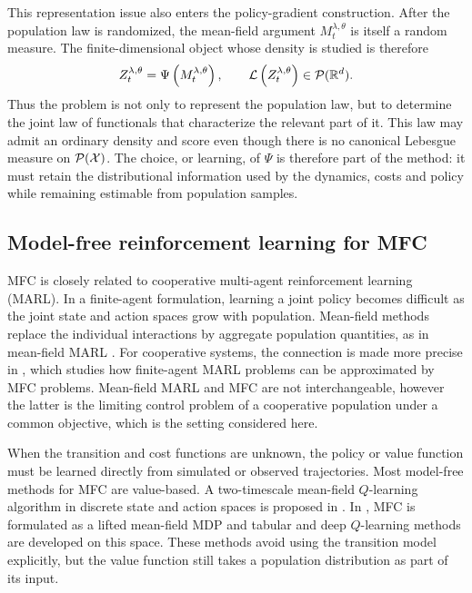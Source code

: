 This representation issue also enters the policy-gradient construction. After the population law is randomized, the mean-field argument $M_t^{\lambda,\theta}$ is itself a random measure. The finite-dimensional object whose density is studied is therefore
\begin{align}
    \label{eq:background-random_measure_representation}
    Z_t^{\lambda,\theta} = \Psi\left(M_t^{\lambda,\theta}\right),\qquad {\cal L}\left(Z_t^{\lambda,\theta}\right)\in{\cal P}(\mathbb{R}^d).
\end{align}
Thus the problem is not only to represent the population law, but to determine the joint law of functionals that characterize the relevant part of it. This law may admit an ordinary density and score even though there is no canonical Lebesgue measure on ${\cal P}({\cal X})$. The choice, or learning, of $\Psi$ is therefore part of the method: it must retain the distributional information used by the dynamics, costs and policy while remaining estimable from population samples.

\subsection{Model-free reinforcement learning for MFC}

MFC is closely related to cooperative multi-agent reinforcement learning (MARL). In a finite-agent formulation, learning a joint policy becomes difficult as the joint state and action spaces grow with population. Mean-field methods replace the individual interactions by aggregate population quantities, as in mean-field MARL \cite{yang2018mean}. For cooperative systems, the connection is made more precise in \cite{mondal2022approximation}, which studies how finite-agent MARL problems can be approximated by MFC problems. Mean-field MARL and MFC are not interchangeable, however the latter is the limiting control problem of a cooperative population under a common objective, which is the setting considered here.

When the transition and cost functions are unknown, the policy or value function must be learned directly from simulated or observed trajectories. Most model-free methods for MFC are value-based. A two-timescale mean-field $Q$-learning algorithm in discrete state and action spaces is proposed in \cite{angiuli2022unified}. In \cite{carmona2023model}, MFC is formulated as a lifted mean-field MDP and tabular and deep $Q$-learning methods are developed on this space. These methods avoid using the transition model explicitly, but the value function still takes a population distribution as part of its input.

